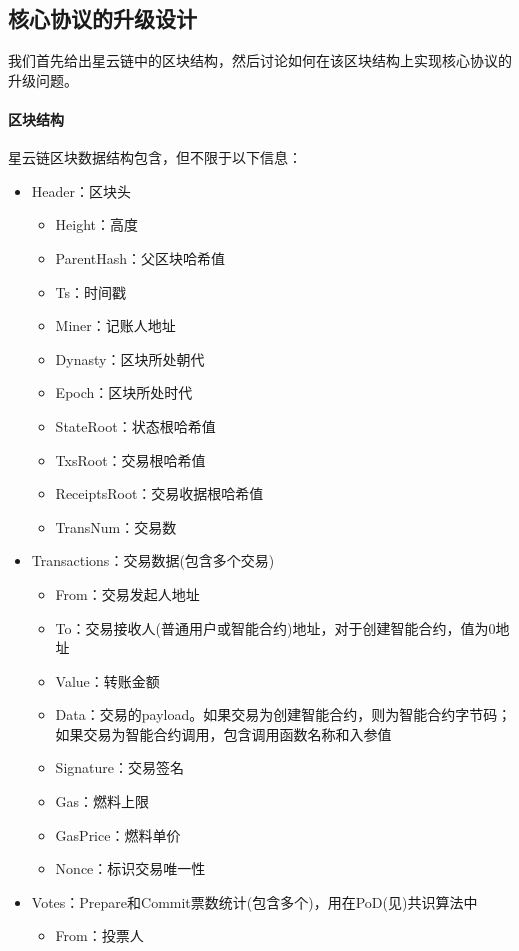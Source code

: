 \subsection{核心协议的升级设计}

我们首先给出星云链中的区块结构，然后讨论如何在该区块结构上实现核心协议的升级问题。

\paragraph{区块结构}

星云链区块数据结构包含，但不限于以下信息：
\begin{itemize}
	\item Header：区块头
		\begin{itemize}
		\item Height：高度
		\item ParentHash：父区块哈希值
		\item Ts：时间戳
		\item Miner：记账人地址
		\item Dynasty：区块所处朝代
		\item Epoch：区块所处时代
		\item StateRoot：状态根哈希值
		\item TxsRoot：交易根哈希值
		\item ReceiptsRoot：交易收据根哈希值
		\item TransNum：交易数
		\end{itemize}
	\item Transactions：交易数据(包含多个交易)
		\begin{itemize}
		\item From：交易发起人地址
		\item To：交易接收人(普通用户或智能合约)地址，对于创建智能合约，值为0地址
		\item Value：转账金额
		\item Data：交易的payload。如果交易为创建智能合约，则为智能合约字节码；如果交易为智能合约调用，包含调用函数名称和入参值
		\item Signature：交易签名
		\item Gas：燃料上限
		\item GasPrice：燃料单价
		\item Nonce：标识交易唯一性
		\end{itemize}
	\item Votes：Prepare和Commit票数统计(包含多个)，用在PoD(见)共识算法中
		\begin{itemize}
		\item From：投票人

\end{itemize}
\end{itemize}
